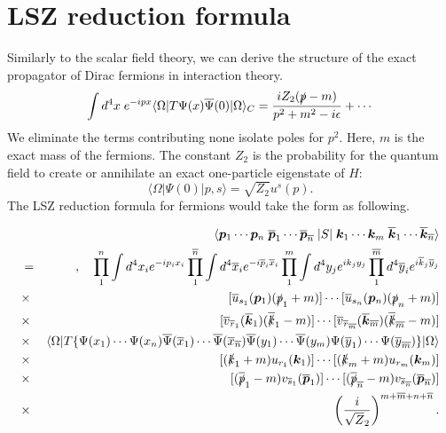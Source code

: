 \section{LSZ reduction formula}
Similarly to the scalar field theory, we can derive the structure of the exact propagator of Dirac fermions in interaction theory.
\[\int d^4x \; e^{-ipx} \langle \Omega | T \Psi(x) \overline{\Psi}(0) | \Omega \rangle_C = \frac{iZ_2(\slashed{p}-m)}{p^2+m^2-i\epsilon} + \cdots \]
We eliminate the terms contributing none isolate poles for $p^2$. Here, $m$ is the exact mass of the fermions. The constant $Z_2$ is the probability for the quantum field to create or annihilate an exact one-particle eigenstate of $H$:
\[\langle \Omega | \Psi(0) | p,s \rangle = \sqrt{Z_2} u^s(p).\]
The LSZ reduction formula for fermions would take the form as following.
\\

\begin{newthem}
\begin{eqnarray}
&\phantom{=}& \langle \bm{p}_1 \cdots \bm{p}_n \;
\overline{\bm{p}}_1 \cdots \overline{\bm{p}}_{\overline{n}} \;
| S | \;
\bm{k}_1 \cdots \bm{k}_m \;
\overline{\bm{k}}_1 \cdots \overline{\bm{k}}_{\overline{n}} \rangle 
\nonumber \\
&=& , \quad \prod_1^n \int d^4 x_i e^{-i p_ix_i }
\prod_1^{\overline{n}} \int d^4 \overline{x}_i e^{-i \overline{p}_i\overline{x}_i }
\prod_1^m \int d^4 y_j e^{ik_jy_j}
\prod_1^{\overline{m}} d^4 \overline{y}_i e^{i\overline{k}_j\overline{y}_j}
\nonumber \\
&\times & [\overline{u}_{s_1}(\bm{p}_1)(\slashed{p}_1+m)] \cdots [\overline{u}_{s_n}(\bm{p}_n)(\slashed{p}_n+m)]
\nonumber \\
&\times & [\overline{v}_{\overline{r}_1}(\overline{\bm{k}}_1)(\overline{\slashed{k}}_1 - m)] \cdots [\overline{v}_{\overline{r}_{\overline{m}}}(\overline{\bm{k}}_{\overline{m}})(\overline{\slashed{k}}_{\overline{m}} - m)]
\nonumber \\
&\times & \langle \Omega | T \{\Psi(x_1) \cdots \Psi(x_n)
\overline{\Psi}(\overline{x}_1) \cdots \overline{\Psi}(\overline{x}_{\overline{n}}) 
\overline{\Psi}(y_1) \cdots \overline{\Psi}(y_m)
\Psi(\overline{y}_1) \cdots \Psi(\overline{y}_{\overline{m}})\} 
| \Omega \rangle 
\nonumber \\
&\times & [(\slashed{k}_1+m) u_{r_1}(\bm{k}_1)] \cdots [(\slashed{k}_m+m)u_{r_m}(\bm{k}_m)] \nonumber \\
&\times & [(\overline{\slashed{p}}_1 - m) v_{\overline{s}_1}(\overline{\bm{p}}_1)] \cdots [(\overline{\slashed{p}}_{\overline{n}} - m) v_{\overline{s}_{\overline{n}}}(\overline{\bm{p}}_{\overline{n}})] \nonumber \\
&\times & \left( \frac{i}{\sqrt{Z}_2} \right) ^{m+\overline{m}+n+\overline{n}} .\nonumber
\end{eqnarray}
\end{newthem}

